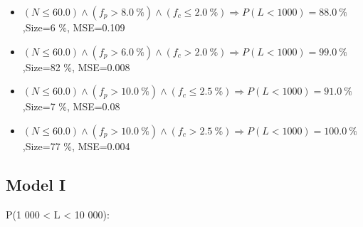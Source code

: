 \documentclass[numbered]{CSL}
\begin{document}
\begin{itemize}
\item $(N \leq 60.0) \land (f_p > 8.0~\%) \land (f_c \leq 2.0~\%) \Rightarrow P(L < 1 000) = 88.0~\%$,\hfill Size=6 \%, MSE=0.109
\item $(N \leq 60.0) \land (f_p > 6.0~\%) \land (f_c > 2.0~\%) \Rightarrow P(L < 1 000) = 99.0~\%$,\hfill Size=82 \%, MSE=0.008
\item $(N \leq 60.0) \land (f_p > 10.0~\%) \land (f_c \leq 2.5~\%) \Rightarrow P(L < 1 000) = 91.0~\%$,\hfill Size=7 \%, MSE=0.08
\item $(N \leq 60.0) \land (f_p > 10.0~\%) \land (f_c > 2.5~\%) \Rightarrow P(L < 1 000) = 100.0~\%$,\hfill Size=77 \%, MSE=0.004
\end{itemize}

\subsection{Model I}
P(1 000 < L < 10 000):
\end{document}
